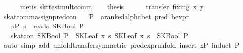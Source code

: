 \begin{isabellebody}
\ \ \ \ \isamarkupfalse%
\ {}metis\ skt{}test{}mult{}comm{}\isanewline
\ \ \isamarkupfalse%
\ {}thesis\isanewline
\ \ \ \ \isamarkupfalse%
\ {}transfer\ fixing{}\ x\ y{}\isanewline
{}\isamarkupfalse%
%
\endisatagproof
{\isafoldproof}%
%
\isadelimproof
\isanewline
%
\endisadelimproof
\isanewline
{}\isamarkupfalse%
\ skat{}comm{}assign{}pred{}con{}\isanewline
\ \ \ P\ {}{}\ {}{}a{}{}ranked{}alphabet\ pred\ bexpr{}\isanewline
\ \ \ xP{}\ {}x\ {}\ reads\ {}SKBool\ P{}{}\isanewline
\ \ \ {}skat{}con\ {}SKBool\ P\ {}{}{}\ SKLeaf\ x\ s{}\ {}SKLeaf\ x\ s\ {}{}{}\ SKBool\ P{}{}\isanewline
%
\isadelimproof
%
\endisadelimproof
%
\isatagproof
{}\isamarkupfalse%
\ {}auto\ simp\ add{}\ unfold{}transfer{}symmetric{}\ pred{}expr{}unfold{}\ insert\ xP{}\ induct\ P{}\isanewline

\end{isabellebody}
